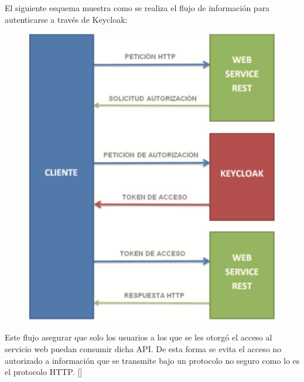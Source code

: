 El siguiente esquema muestra como se realiza el flujo de información para autenticarse a través de Keycloak:

\begin{figure}[H]
	\centering
	\includegraphics[width=0.7\linewidth]{Graphics/keycloak_info_flux}
	\caption{}
	\label{fig:Flujo de Información en Keycloak}
\end{figure}

Este flujo asegurar que solo los usuarios a los que se les otorgó el acceso al servicio web puedan consumir dicha API. De esta forma se evita el acceso no autorizado a información que se transmite bajo un protocolo no seguro como lo es el protocolo HTTP. [\cite{muyon2020metodos}]
